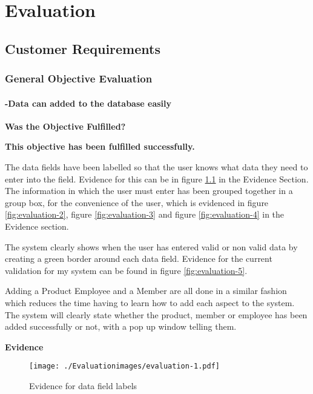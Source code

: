 \chapter{Evaluation}

\section{Customer Requirements}

\subsection{General Objective Evaluation}

\subsubsection{-Data can added to the database easily}
\textbf{Was the Objective Fulfilled?} \newline

\textbf{\large{This objective has been fulfilled successfully.}}

The data fields have been labelled so that the user knows what data they need to enter into the field. Evidence for this can be in figure \ref{fig:evaluation-1} in the Evidence Section. The information in which the user must enter has been grouped together in a group box, for the convenience of the user, which is evidenced in figure \ref{fig:evaluation-2}, figure \ref{fig:evaluation-3} and figure \ref{fig:evaluation-4} in the Evidence section.


The system clearly shows when the user has entered valid or non valid data by creating a green border around each data field. Evidence for the current validation for my system can be found in figure \ref{fig:evaluation-5}.

Adding a Product Employee and a Member are all done in a similar fashion which reduces the time having to learn how to add each aspect to the system. The system will clearly state whether the product, member or employee has been added successfully or not, with a pop up window telling them.\newline

\pagebreak
\textbf{Evidence} \newline

\begin{figure}[H]
\caption{Evidence for data field labels} \label{fig:evaluation-1}
\hfill\texttt{[image: ./Evaluationimages/evaluation-1.pdf]}
\end{figure}


